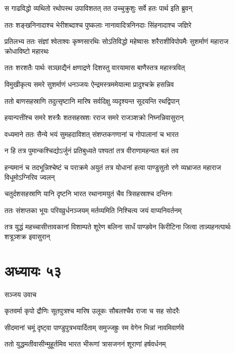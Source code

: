 \twolineshloka
{स गाढविद्धो व्यथितो रथोपस्थ उपाविशतत्}
{तत उच्चुक्रुशुः सर्वे हतः पार्थ इति ब्रुवन्}


\twolineshloka
{ततः शङ्खनिनादाश्च भेरीशब्दाश्च पुष्कलाः}
{नानावादित्रनिनदाः सिंहनादाश्च जज्ञिरे}


\threelineshloka
{प्रतिलभ्य ततः संज्ञां श्वेताश्वः कृष्णसारथिः}
{सोऽतिविद्धो महेष्वासः शरैराशीविपोपमैः}
{सुशर्माणं महाराज क्रोधाविष्टो महारथः}


\twolineshloka
{ततः शरशतैः पार्थः सञ्छाद्यैनं क्षणाद्रणे}
{दिशस्तु वारयामास बाणैस्तत्र महास्त्रवित्}


\twolineshloka
{विमुखीकृत्य समरे सुशर्माणं धनञ्जयः}
{ऐन्द्रमस्त्रममेयात्मा प्रादुश्चक्रे हसन्निव}


\twolineshloka
{ततो बाणसहस्राणि तदुत्सृष्टानि मारिष}
{सर्वदिक्षु व्यदृश्यन्त सूदयन्ति रथद्विपान्}


\twolineshloka
{हयान्पत्तींश्च समरे शस्त्रैः शतसहस्रशः}
{रराज समरे राजञ्शक्रो निघ्नन्निवासुरान्}


\twolineshloka
{वध्यमाने ततः सैन्ये भयं सुमहदाविशत्}
{संशप्तकगणानां च गोपालानां च भारत}


\twolineshloka
{न हि तत्र पुमान्कश्चिद्योऽर्जुनं प्रतिबुध्यते}
{पश्यतां तत्र वीराणामहन्यत बलं तव}


हन्यमानं च तदभून्निश्चेष्टं च पराक्रमे
\twolineshloka
{अयुतं तत्र योधानां हत्वा पाण्डुसुतो रणे}
{व्यभ्राजत महाराज विधूमोऽग्निरिव ज्वलन्}


\twolineshloka
{चतुर्दशसहस्राणि यानि दृष्टनि भारत}
{रथानामयुतं चैव त्रिसहस्राश्च दन्तिनः}


\twolineshloka
{ततः संशप्तका भूयः परिवव्रुर्धनञ्जयम्}
{मर्तव्यमिति निश्चित्य जयं वाप्यनिवर्तनम्}


\threelineshloka
{तत्र युद्धं महच्चासीत्तावकानां विशाम्पते}
{शूरेण बलिना सार्धं पाण्डवेन किरीटिना}
{जित्वा तान्न्यहनत्पार्थः शत्रूञ्शक्र इवासुरान्}


\chapter{अध्यायः ५३}
\twolineshloka
{सञ्जय उवाच}
{}


\twolineshloka
{कृतवर्मा कृपो द्रौणिः सूतपुत्रश्च मारिष}
{उलूकः सौबलश्चैव राजा च सह सोदरैः}


\twolineshloka
{सीदमानां चमूं दृष्ट्वा पाण्डुपुत्रभयार्दिताम्}
{समुज्जह्रुः स्म वेगेन भिन्नां नावमिवार्णवे}


\twolineshloka
{ततो युद्धमतीवासीन्मुहूर्तमिव भारत}
{भीरूणां त्रासजननं शूराणां हर्षवर्धनम्}


